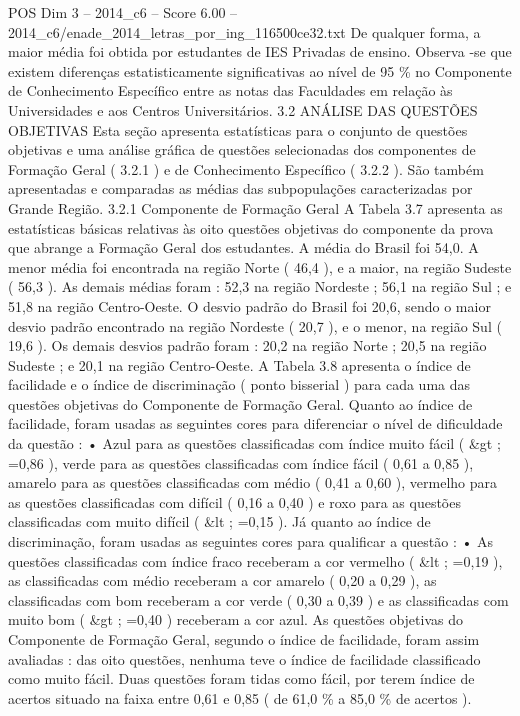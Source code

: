 \begin{textsample}{POS Dim 3 – 2014\_c6 – Score 6.00 – 2014\_c6/enade\_2014\_letras\_por\_ing\_116500ce32.txt}
De qualquer forma, a maior média foi obtida por estudantes de IES Privadas de ensino.
Observa -se que existem diferenças estatisticamente significativas ao nível de 95 \% no Componente de Conhecimento Específico entre as notas das Faculdades em relação às Universidades e aos Centros Universitários. 3.2 ANÁLISE DAS QUESTÕES OBJETIVAS Esta seção apresenta estatísticas para o conjunto de questões objetivas e uma análise gráfica de questões selecionadas dos componentes de Formação Geral ( 3.2.1 ) e de Conhecimento Específico ( 3.2.2 ).
São também apresentadas e comparadas as médias das subpopulações caracterizadas por Grande Região. 3.2.1 Componente de Formação Geral A Tabela 3.7 apresenta as estatísticas básicas relativas às oito questões objetivas do componente da prova que abrange a Formação Geral dos estudantes.
A média do Brasil foi 54,0.
A menor média foi encontrada na região Norte ( 46,4 ), e a maior, na região Sudeste ( 56,3 ).
As demais médias foram : 52,3 na região Nordeste ; 56,1 na região Sul ; e 51,8 na região Centro-Oeste.
O desvio padrão do Brasil foi 20,6, sendo o maior desvio padrão encontrado na região Nordeste ( 20,7 ), e o menor, na região Sul ( 19,6 ).
Os demais desvios padrão foram : 20,2 na região Norte ; 20,5 na região Sudeste ; e 20,1 na região Centro-Oeste.
A Tabela 3.8 apresenta o índice de facilidade e o índice de discriminação ( ponto bisserial ) para cada uma das questões objetivas do Componente de Formação Geral.
Quanto ao índice de facilidade, foram usadas as seguintes cores para diferenciar o nível de dificuldade da questão : • Azul para as questões classificadas com índice muito fácil ( \&gt ; =0,86 ), verde para as questões classificadas com índice fácil ( 0,61 a 0,85 ), amarelo para as questões classificadas com médio ( 0,41 a 0,60 ), vermelho para as questões classificadas com difícil ( 0,16 a 0,40 ) e roxo para as questões classificadas com muito difícil ( \&lt ; =0,15 ).
Já quanto ao índice de discriminação, foram usadas as seguintes cores para qualificar a questão : • As questões classificadas com índice fraco receberam a cor vermelho ( \&lt ; =0,19 ), as classificadas com médio receberam a cor amarelo ( 0,20 a 0,29 ), as classificadas com bom receberam a cor verde ( 0,30 a 0,39 ) e as classificadas com muito bom ( \&gt ; =0,40 ) receberam a cor azul.
As questões objetivas do Componente de Formação Geral, segundo o índice de facilidade, foram assim avaliadas : das oito questões, nenhuma teve o índice de facilidade classificado como muito fácil.
Duas questões foram tidas como fácil, por terem índice de acertos situado na faixa entre 0,61 e 0,85 ( de 61,0 \% a 85,0 \% de acertos ).

\end{textsample}

